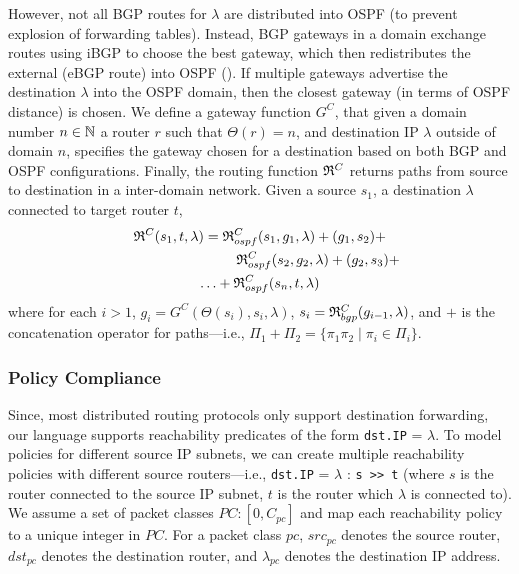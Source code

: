 However, not all BGP routes for $\lambda$
are distributed 
into OSPF (to prevent explosion of forwarding tables). Instead,
BGP gateways in a domain exchange routes using iBGP to choose
the best gateway, which then redistributes the external
(eBGP route) into OSPF (). If multiple
gateways advertise the destination $\lambda$ into the OSPF 
domain, then the closest gateway (in terms of OSPF distance)
is chosen. We define a gateway function $G^C$,
that given a domain number $n\in \mathbb{N}$
a router $r$ such that $\Theta(r)=n$,
and destination IP $\lambda$ outside of domain $n$, specifies the
gateway chosen for a destination based on both BGP and OSPF
configurations. 
Finally, the routing function 
$\mathfrak{R}^C$
returns paths from source to destination in a inter-domain network. 
Given a source $s_1$, a destination $\lambda$ connected to target router $t$, 
\begin{multline}
	\mathfrak{R}^C(s_1, t, \lambda) = 
	\mathfrak{R}_{ospf}^C(s_1,g_1, \lambda) + 
	 (g_1, s_2 )+ \\
	~~~~~~~~~~~~~~~~~~~~~~~~~\mathfrak{R}_{ospf}^C(s_2,g_2, \lambda) + (g_2, s_3) + \\
	\ldots  +\mathfrak{R}_{ospf}^C(s_n,t,\lambda)
\end{multline}
where for each $i>1$, $g_i=G^C(\Theta(s_i),s_i,\lambda)$, 
$s_i=\mathfrak{R}_{bgp}^C(g_{i-1}, \lambda)$,
and  $+$ is the concatenation operator for paths---i.e.,
$\Pi_1+\Pi_2=\{\pi_1\pi_2\mid \pi_i\in\Pi_i\}$.

\subsubsection{Policy Compliance}
Since, most distributed routing protocols only support
destination forwarding, our language supports reachability predicates 
of the form \texttt{dst.IP} = $\lambda$. To 
model policies for different source IP subnets, we can create
multiple reachability policies with different source routers---i.e.,
\texttt{dst.IP} = $\lambda$ : \texttt{s >> t} (where $s$ is
the router connected to the source IP subnet, $t$ is the router
which $\lambda$ is connected to).
We assume a set of packet classes $PC : [0,C_{pc}]$ 
and map each reachability policy to a unique integer in $PC$.
For a packet class $pc$, $src_{pc}$ denotes the source router,
$dst_{pc}$ denotes the destination router, and $\lambda_{pc}$
denotes the destination IP address. 

